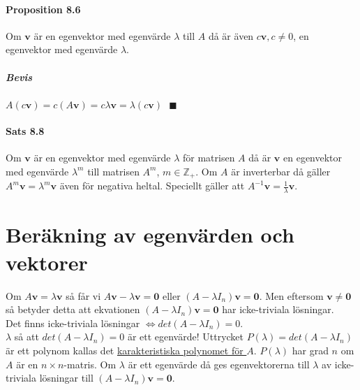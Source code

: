 \paragraph{Proposition 8.6} Om $\bm{v}$ är en egenvektor med egenvärde $\lambda$ till $A$ då är även $c\bm{v},c\neq 0$, en egenvektor med egenvärde $\lambda$.
\subparagraph{Bevis} $A(c\bm{v})=c(A\bm{v})=c\lambda\bm{v}=\lambda(c\bm{v})\text{ }\blacksquare$

\paragraph{Sats 8.8} Om $\bm{v}$ är en egenvektor med egenvärde $\lambda$ för matrisen $A$ då är 
$\bm{v}$ en egenvektor med egenvärde $\lambda^m$ till matrisen $A^m$, $m\in\mathbb{Z}_+$.
Om $A$ är inverterbar då gäller $A^m\bm{v}=\lambda^m\bm{v}$ även för negativa heltal.
Speciellt gäller att $A^{-1}\bm{v}=\frac{1}{\lambda}\bm{v}$.

\clearpage
\section{Beräkning av egenvärden och vektorer}
Om $A\bm{v}=\lambda\bm{v}$ så får vi $A\bm{v}-\lambda\bm{v}=\bm{0}$ eller $(A-\lambda I_n)\bm{v}=\bm{0}$.
Men eftersom $\bm{v}\neq\bm{0}$ så betyder detta att ekvationen $(A-\lambda I_n)\bm{v}=\bm{0}$ har icke-triviala lösningar.\\
Det finns icke-triviala lösningar $\Leftrightarrow det(A-\lambda I_n)=0$.\\
$\lambda$ så att $det(A-\lambda I_n)=0$ är ett egenvärde!
Uttrycket $P(\lambda)=det(A-\lambda I_n)$ är ett polynom kallas det \underline{karakteristiska polynomet för $A$}.
$P(\lambda)$ har grad $n$ om $A$ är en $n\times n$-matris.
Om $\lambda$ är ett egenvärde då ges egenvektorerna till $\lambda$ av icke-triviala lösningar till $(A-\lambda I_n)\bm{v}=\bm{0}$.

